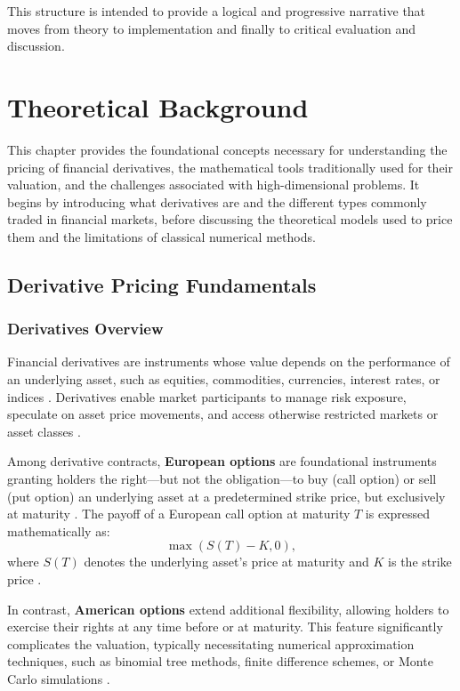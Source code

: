 \documentclass[12pt]{report} %
\theoremstyle{plain}           %
\theoremstyle{definition}      %
\theoremstyle{remark}          %
\begin{document}
This structure is intended to provide a logical and progressive narrative that moves from theory to 
implementation and finally to critical evaluation and discussion.


\chapter{Theoretical Background}
This chapter provides the foundational concepts necessary for understanding the pricing of financial 
derivatives, the mathematical tools traditionally used for their valuation, and the challenges 
associated with high-dimensional problems. It begins by introducing what derivatives are and the 
different types commonly traded in financial markets, before discussing the theoretical models used 
to price them and the limitations of classical numerical methods.

\section{Derivative Pricing Fundamentals}

\subsection{Derivatives Overview}

Financial derivatives are instruments whose value depends on the performance of an underlying asset, 
such as equities, commodities, currencies, interest rates, or indices \cite{alma99148840908702021}. Derivatives 
enable market participants to manage risk exposure, speculate on asset price movements, and access 
otherwise restricted markets or asset classes \cite{alma99148840908702021,Wilmott2010PaulWO}.

Among derivative contracts, \textbf{European options} are foundational instruments granting holders 
the right—but not the obligation—to buy (call option) or sell (put option) an underlying asset at a 
predetermined strike price, but exclusively at maturity \cite{blackscholes}. The payoff of a 
European call option at maturity \(T\) is expressed mathematically as:
\begin{equation}
\max(S(T) - K, 0),
\label{euro_call_payoff}
\end{equation}
where \(S(T)\) denotes the underlying asset's price at maturity and \(K\) is the strike price 
\cite{alma99148840908702021}.

In contrast, \textbf{American options} extend additional flexibility, allowing holders to exercise 
their rights at any time before or at maturity. This feature significantly complicates the valuation, 
typically necessitating numerical approximation techniques, such as binomial tree methods, finite 
difference schemes, or Monte Carlo simulations \cite{glasserman2004monte, Wilmott2010PaulWO}.
\end{document}
